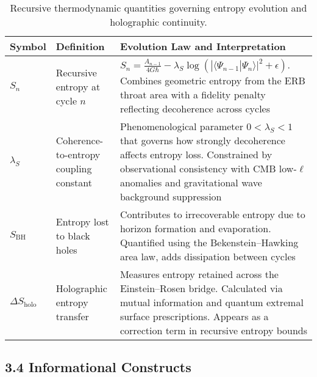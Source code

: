 \begin{table}[h!]
\centering
\begin{tabular}{>{\raggedright}p{3cm}>{\raggedright}p{6.5cm}>{\raggedright\arraybackslash}p{5cm}}
\toprule
\textbf{Symbol} & \textbf{Definition} & \textbf{Evolution Law and Interpretation} \\
\midrule
$S_n$ & Recursive entropy at cycle $n$ & 
$S_n = \frac{A_{n-1}}{4G\hbar} - \lambda_S \log\left( |\langle \Psi_{n-1} | \Psi_n \rangle|^2 + \epsilon \right)$.
Combines geometric entropy from the ERB throat area with a fidelity penalty reflecting decoherence across cycles \cite{bousso2002holographic} \\
\addlinespace
$\lambda_S$ & Coherence-to-entropy coupling constant & 
Phenomenological parameter $0 < \lambda_S < 1$ that governs how strongly decoherence affects entropy loss. Constrained by observational consistency with CMB low-$\ell$ anomalies and gravitational wave background suppression \\
\addlinespace
$S_{\text{BH}}$ & Entropy lost to black holes & 
Contributes to irrecoverable entropy due to horizon formation and evaporation. Quantified using the Bekenstein–Hawking area law, adds dissipation between cycles \cite{bekenstein1973black} \\
\addlinespace
$\Delta S_{\text{holo}}$ & Holographic entropy transfer & 
Measures entropy retained across the Einstein–Rosen bridge. Calculated via mutual information and quantum extremal surface prescriptions. Appears as a correction term in recursive entropy bounds \cite{almheiri2019entropy, bousso2002holographic} \\
\bottomrule
\end{tabular}
\caption{Recursive thermodynamic quantities governing entropy evolution and holographic continuity.}
\end{table}

\subsection*{3.4 Informational Constructs}


